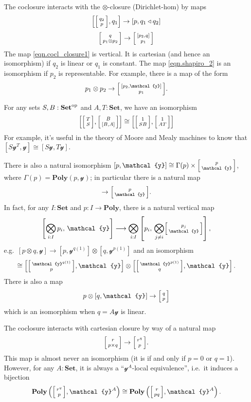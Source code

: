 \documentclass[11pt, one side, article]{memoir}
\makeatletter
\theoremstyle{definition}
\theoremstyle{plain}
\newcommand{\Cat}[1]{\mathbf{#1}}%
\newcommand{\too}{\longrightarrow}
\newcommand{\op}{^\tn{op}}
\newcommand{\tn}[1]{\textnormal{#1}}
\newcommand{\smset}{\Cat{Set}}
\newcommand{\yon}{{\mathcal{y}}}
\newcommand{\poly}{\Cat{Poly}}
\newcommand{\0}{\textsf{0}}
\newcommand{\1}{\tn{\textsf{1}}}
\newcommand{\tri}{\mathbin{\triangleleft}}
\newcommand{\biglens}[2]{
     \begin{bmatrix}{\vphantom{f_f^f}#2} \\ {\vphantom{f_f^f}#1} \end{bmatrix}
}
\newcommand{\littlelens}[2]{
     \begin{bsmallmatrix}{\vphantom{f}#2} \\ {\vphantom{f}#1} \end{bsmallmatrix}
}
\newcommand{\lens}[2]{
  \relax\if@display
     \biglens{#1}{#2}
  \else
     \littlelens{#1}{#2}
  \fi
}
\makeatother
\begin{document}
The coclosure interacts with the $\otimes$-closure (Dirichlet-hom) by maps
\begin{equation}
\label{eqn.cocl_closure1}
	\left[\lens{p}{q_2},q_1\right]\to[p,q_1\tri q_2]
\end{equation}
\begin{equation}\label{eqn.shapiro_2}
	\lens{p_1\otimes p_2}{q}\to\lens{p_1}{\left[p_2,q\right]}
\end{equation}
The map \eqref{eqn.cocl_closure1} is vertical. It is cartesian (and hence an isomorphism) if $q_2$ is linear or $q_1$ is constant. The map \eqref{eqn.shapiro_2} is an isomorphism if $p_2$ is representable. For example, there is a map of the form
\begin{equation}
  p_1\otimes p_2\to\lens{p_1}{[p_2,\yon]}.
\end{equation}

For any sets $S,B:\smset\op$ and $A,T:\smset$, we have an isomorphism
\begin{equation}
	\left[\lens{S}{T},\lens{[B,A]}{B}\right]
	\cong
	\left[\lens{SB}{1},\lens{AT}{1}\right]
\end{equation}
For example, it's useful in the theory of Moore and Mealy machines to know that $[S\yon^T,\yon]\cong[S\yon,T\yon]$.

There is also a natural isomorphism $[p,\yon]\cong\Gamma(p)\times\lens{\yon}{p}$, where $\Gamma(p)=\poly(p,\yon)$; in particular there is a natural map
\begin{equation}
	[p,\yon]\to\lens{\yon}{p}.
\end{equation}
In fact, for any $I:\smset$ and $p\colon I\to\poly$, there is a natural vertical map
\begin{equation}
	\left[\bigotimes_{i:I}p_i,\,\yon\right]\too\bigotimes_{i:I}\left[p_i,\,\bigotimes_{j\neq i}\lens{\yon}{p_j}\right],
\end{equation}
e.g.\ $[p\otimes q,\yon]\to[p,\yon^{q(1)}]\otimes[q,\yon^{p(1)}]$ and an isomorphism
\begin{equation}
	[p\otimes q,\yon]\cong\left[\lens{p}{\yon^{q(1)}},\yon\right]\otimes\left[\lens{q}{\yon^{p(1)}},\yon\right].
\end{equation}
There is also a map
\begin{equation}
p\otimes[q,\yon]\to\lens{p}{q}
\end{equation}
which is an isomorphism when $q=A\yon$ is linear.

The coclosure interacts with cartesian closure by way of a natural map
\begin{equation}
	\lens{p\times q}{r}\to\lens{p}{r^q}.
\end{equation}
This map is almost never an isomorphism (it is if and only if $p=0$ or $q=1$). However, for any $A:\smset$, it is always a ``$\yon^A$-local equivalence'', i.e.\ it induces a bijection
\begin{equation}
	\poly\left(\lens{p}{r^q},\yon^A\right)
	\cong
	\poly\left(\lens{pq}{r},\yon^A\right).
\end{equation}
\end{document}
